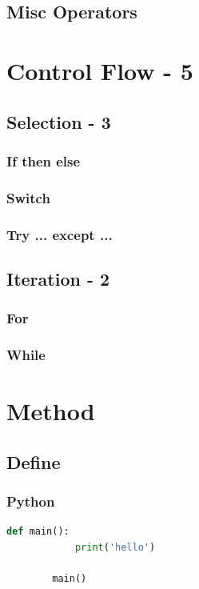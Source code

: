 \documentclass[12pt, a4paper]{report}
\begin{document}
        \subsection{Misc Operators}
        
        
        
	
\section{Control Flow - 5}	
	\subsection{Selection - 3}
		\subsubsection{If then else}
		\subsubsection{Switch}
		\subsubsection{Try ... except ...}
	\subsection{Iteration - 2}
		\subsubsection{For}
		\subsubsection{While}


\section{Method}
	\subsection{Define}
		\subsubsection{Python}
		\begin{lstlisting}[language={python}]
		def main():
   			print('hello')
			
		main()
		\end{lstlisting}
\end{document}
